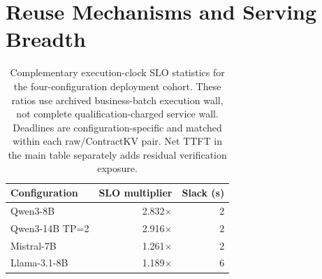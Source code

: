 \section{Reuse Mechanisms and Serving Breadth}
\label{sec:s-mechanisms}
\begin{table}[t]
\centering\small
\caption{Complementary execution-clock SLO statistics for the four-configuration deployment cohort. These ratios use archived business-batch execution wall, not complete qualification-charged service wall. Deadlines are configuration-specific and matched within each raw/ContractKV pair. Net TTFT in the main table separately adds residual verification exposure.}
\label{tab:s-execution-slo}
\begin{tabular}{@{}lrr@{}}
\toprule
Configuration & SLO multiplier & Slack (s)\\
\midrule
Qwen3-8B & 2.832$\times$ & 2\\
Qwen3-14B TP=2 & 2.916$\times$ & 2\\
Mistral-7B & 1.261$\times$ & 2\\
Llama-3.1-8B & 1.189$\times$ & 6\\
\bottomrule
\end{tabular}
\end{table}

